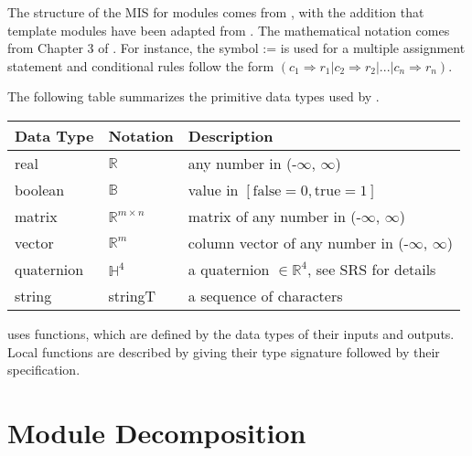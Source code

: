 \documentclass[12pt, titlepage]{article}
\begin{document}

The structure of the MIS for modules comes from \citet{HoffmanAndStrooper1995}, with the addition
that template modules have been adapted from \cite{GhezziEtAl2003}.  The mathematical notation comes
from Chapter 3 of \citet{HoffmanAndStrooper1995}.  For instance, the symbol := is used for a
multiple assignment statement and conditional rules follow the form $(c_1 \Rightarrow r_1 | c_2
\Rightarrow r_2 | ... | c_n \Rightarrow r_n )$.

The following table summarizes the primitive data types used by \progname.

\begin{center}
\renewcommand{\arraystretch}{1.2}
\noindent
\begin{tabular}{l l p{7.5cm}}
\toprule
\textbf{Data Type} & \textbf{Notation} & \textbf{Description}\\
\midrule
real & $\mathbb{R}$ & any number in (-$\infty$, $\infty$)\\
boolean & $\mathbb{B}$ & value in $[\text{false}=0, \text{true}=1]$\\
matrix & $\mathbb{R}^{m \times n}$ & matrix of any number in (-$\infty$, $\infty$)\\
vector & $\mathbb{R}^{m}$ & column vector of any number in (-$\infty$, $\infty$)\\
quaternion & $\mathbb{H}^4$ & a quaternion $\in \mathbb{R}^4$, see SRS for details\\
string & stringT & a sequence of characters \\
\bottomrule
\end{tabular}
\end{center}

\noindent
\progname{} uses functions, which are defined by the data types of their inputs and outputs. Local
functions are described by giving their type signature followed by their specification.

\section{Module Decomposition}
\end{document}

